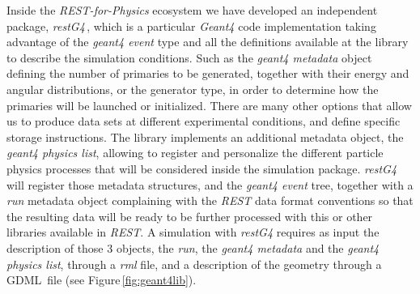 Inside the \emph{REST-for-Physics} ecosystem we have developed an independent package, \emph{restG4}\,\cite{REST_restG4_Git}, which is a particular \emph{Geant4} code implementation taking advantage of the \emph{geant4 event} type and all the definitions available at the library to describe the simulation conditions. Such as the \emph{geant4 metadata} object defining the number of primaries to be generated, together with their energy and angular distributions, or the generator type, in order to determine how the primaries will be launched or initialized. There are many other options that allow us to produce data sets at different experimental conditions, and define specific storage instructions. The library implements an additional metadata object, the \emph{geant4 physics list}, allowing to register and personalize the different particle physics processes that will be considered inside the simulation package. \emph{restG4} will register those metadata structures, and the \emph{geant4 event} tree, together with a \emph{run} metadata object complaining with the \emph{REST} data format conventions so that the resulting data will be ready to be further processed with this or other libraries available in \emph{REST}. A simulation with \emph{restG4} requires as input the description of those 3 objects, the \emph{run}, the \emph{geant4 metadata} and the \emph{geant4 physics list}, through a \emph{rml} file, and a description of the geometry through a GDML\,\cite{Chytracek:2006be} file (see Figure\,\ref{fig:geant4lib}).



